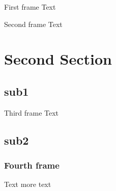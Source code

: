 \documentclass{beamer}
\begin{document}
\begin{frame}{First frame}
Text
\end{frame}

\begin{frame}{Second frame}
Text
\end{frame}



\section{Second Section}

\subsection{sub1}
\begin{frame}{Third frame}
Text
\end{frame}

\subsection{sub2}
\begin{frame}
\frametitle{Fourth frame}
Text
\pause
more text
\end{frame}
\end{document}
